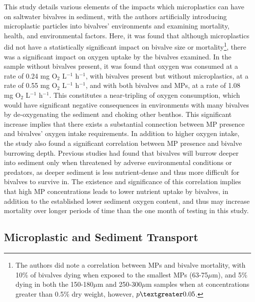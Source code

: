 \documentclass[fleqn,10pt]{SelfArx} %
\begin{document}
	This study details various elements of the impacts which microplastics can have on saltwater bivalves in sediment, with the authors artificially introducing microplastic particles into bivalves' environments and examining mortality, health, and environmental factors. Here, it was found that although microplastics did not have a statistically significant impact on bivalve size or mortality\footnote{The authors did note a correlation between MPs and bivalve mortality, with 10\% of bivalves dying when exposed to the smallest MPs (63-75$\mu$m), and 5\% dying in both the 150-180$\mu$m and 250-300$\mu$m samples when at concentrations greater than 0.5\% dry weight, however, $p \textgreater 0.05$.}, there was a significant impact on oxygen uptake by the bivalves examined. In the  sample without bivalves present, it was found that oxygen was consumed at a rate of 0.24 mg O$_{2}$ L$^{-1}$ h$^{-1}$, with bivalves present but without microplastics, at a rate of 0.55 mg O$_{2}$ L$^{-1}$ h$^{-1}$, and with both bivalves and MPs, at a rate of 1.08 mg O$_{2}$ L$^{-1}$ h$^{-1}$. This constitutes a near-tripling of oxygen consumption, which would have significant negative consequences in environments with many bivalves by de-oxygenating the sediment and choking other benthos. This significant increase implies that there exists a substantial connection between MP presence and bivalves' oxygen intake requirements. 
	\linebreak
	In addition to higher oxygen intake, the study also found a significant correlation between MP presence and bivalve burrowing depth. Previous studies had found that bivalves will burrow deeper into sediment only when threatened by adverse environmental conditions or predators, as deeper sediment is less nutrient-dense and thus more difficult for bivalves to survive in. The existence and significance of this correlation implies that high MP concentrations leads to lower nutrient uptake by bivalves, in addition to the established lower sediment oxygen content, and thus may increase mortality over longer periods of time than the one month of testing in this study.
	
	\subsection{Microplastic and Sediment Transport}
\end{document}
